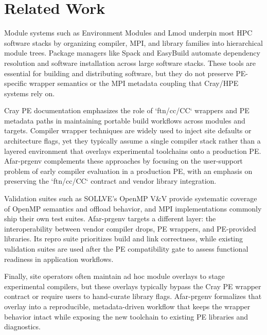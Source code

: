 \section{Related Work}
\label{sec:related}
Module systems such as Environment Modules and Lmod underpin most HPC software
stacks by organizing compiler, MPI, and library families into hierarchical
module trees.\cite{EnvModules2024,Lmod2011} Package managers like Spack and
EasyBuild automate dependency resolution and software installation across
large software stacks.\cite{Spack2015,EasyBuild2012} These tools are essential
for building and distributing software, but they do not preserve PE-specific
wrapper semantics or the MPI metadata coupling that Cray/HPE systems rely on.

Cray PE documentation emphasizes the role of `ftn/cc/CC` wrappers and PE
metadata paths in maintaining portable build workflows across modules and
targets.\cite{CrayPE2024} Compiler wrapper techniques are widely used to inject
site defaults or architecture flags, yet they typically assume a single
compiler stack rather than a layered environment that overlays experimental
toolchains onto a production PE. Afar-prgenv complements these approaches by
focusing on the user-support problem of early compiler evaluation in a
production PE, with an emphasis on preserving the `ftn/cc/CC` contract and
vendor library integration.

Validation suites such as SOLLVE's OpenMP V\&V provide systematic coverage of
OpenMP semantics and offload behavior,\cite{SOLLVE2020,OpenMP2024} and MPI
implementations commonly ship their own test suites.\cite{MPICH2023} Afar-prgenv
targets a different layer: the interoperability between vendor compiler drops,
PE wrappers, and PE-provided libraries. Its repro suite prioritizes build and
link correctness, while existing validation suites are used after the PE
compatibility gate to assess functional readiness in application workflows.

Finally, site operators often maintain ad hoc module overlays to stage
experimental compilers, but these overlays typically bypass the Cray PE
wrapper contract or require users to hand-curate library flags. Afar-prgenv
formalizes that overlay into a reproducible, metadata-driven workflow that
keeps the wrapper behavior intact while exposing the new toolchain to
existing PE libraries and diagnostics.
